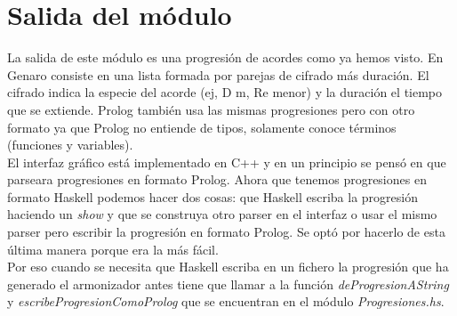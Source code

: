 \normalsize

\section{Salida del m\'odulo}
La salida de este m\'odulo es una progresi\'on de acordes como ya hemos visto.
En Genaro consiste en una lista formada por parejas de cifrado m\'as
duraci\'on. El cifrado indica la especie del acorde (ej, D m, Re menor)
y la duraci\'on el tiempo que se extiende. Prolog tambi\'en usa las mismas
progresiones pero con otro formato ya que Prolog no entiende de tipos,
solamente conoce t\'erminos (funciones y variables).\\
\indent El interfaz gr\'afico
est\'a implementado en C++ y en un principio se pens\'o en que parseara
progresiones en formato Prolog. Ahora que tenemos progresiones en formato
Haskell podemos hacer dos cosas: que Haskell escriba la progresi\'on haciendo
un \emph{show} y que se construya otro parser en el interfaz o usar el mismo
parser pero escribir la progresi\'on en formato Prolog. Se opt\'o por hacerlo
de esta \'ultima manera porque era la m\'as f\'acil.\\
\indent Por eso cuando se necesita que Haskell escriba en un fichero la progresi\'on
que ha generado el armonizador antes tiene que llamar a la funci\'on 
\emph{deProgresionAString} y \emph{escribeProgresionComoProlog} que se encuentran
en el m\'odulo \emph{Progresiones.hs}.
